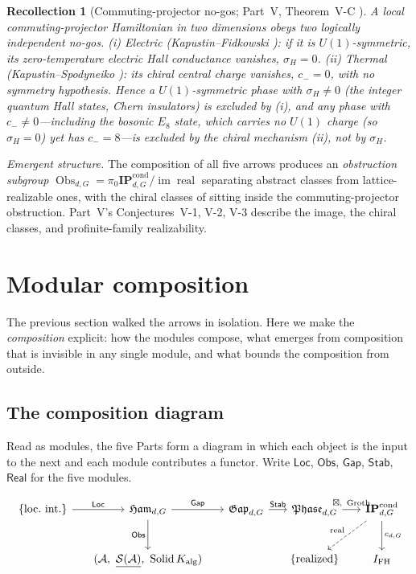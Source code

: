 \documentclass[12pt]{article}
\newcommand{\cond}[1]{\underline{#1}}          %
\newcommand{\Ham}{\mathfrak{Ham}}              %
\newcommand{\Gap}{\mathfrak{Gap}}              %
\newcommand{\Phase}{\mathfrak{Phase}}          %
\newcommand{\IPcond}{\mathbf{IP}^{\mathrm{cond}}}  %
\newcommand{\Kalg}{K_{\mathrm{alg}}}           %
\newcommand{\Solid}{\operatorname{Solid}}      %
\newcommand{\qA}{\mathcal{A}}                  %
\newcommand{\St}{\mathcal{S}}                  %
\newcommand{\Groth}{\operatorname{Groth}}      %
\newcommand{\IFH}{I_{\mathrm{FH}}}             %
\newcommand{\real}{\operatorname{real}}        %
\newcommand{\Obs}{\operatorname{Obs}}
\newcommand{\im}{\operatorname{im}}
\theoremstyle{plain}
\newtheorem{recollection}[recollection]{Recollection}
\theoremstyle{definition}
\theoremstyle{remark}
\begin{document}
\begin{recollection}[Commuting-projector no-gos; Part~V, Theorem~V-C \cite{kapustin-fidkowski,kapustin-spodyneiko-thermal,paperRealizability}]
\label{rec:VC}
A local commuting-projector Hamiltonian in two dimensions obeys two logically independent
no-gos. (i) \emph{Electric} (Kapustin--Fidkowski \cite{kapustin-fidkowski}): if it is
$U(1)$-symmetric, its zero-temperature electric Hall conductance vanishes, $\sigma_H=0$.
(ii) \emph{Thermal} (Kapustin--Spodyneiko \cite{kapustin-spodyneiko-thermal}): its chiral
central charge vanishes, $c_-=0$, with no symmetry hypothesis. Hence a $U(1)$-symmetric
phase with $\sigma_H\ne0$ (the integer quantum Hall states, Chern insulators) is excluded by
(i), and \emph{any} phase with $c_-\ne0$---including the bosonic $E_8$ state, which carries
no $U(1)$ charge (so $\sigma_H=0$) yet has $c_-=8$---is excluded by the chiral mechanism (ii),
not by $\sigma_H$.
\end{recollection}

\emph{Emergent structure.} The composition of all five arrows produces an
\emph{obstruction subgroup} $\Obs_{d,G}=\pi_0\IPcond_{d,G}/\im\real$ separating abstract
classes from lattice-realizable ones, with the chiral classes of  sitting
inside the commuting-projector obstruction. Part~V's Conjectures~V-1, V-2, V-3 describe
the image, the chiral classes, and profinite-family realizability.

\section{Modular composition}
\label{sec:composition}

The previous section walked the arrows in isolation. Here we make the \emph{composition}
explicit: how the modules compose, what emerges from composition that is invisible in any
single module, and what bounds the composition from outside.

\subsection{The composition diagram}
\label{sec:compdiagram}

Read as modules, the five Parts form a diagram in which each object is the input to the
next and each module contributes a functor. Write $\mathsf{Loc}$, $\mathsf{Obs}$,
$\mathsf{Gap}$, $\mathsf{Stab}$, $\mathsf{Real}$ for the five modules.

\begin{equation}
\label{eq:compdiagram}
\begin{tikzcd}[column sep=1.5em, row sep=2.6em]
\{\text{loc.\ int.}\}
  \arrow[r, "\mathsf{Loc}"]
& \Ham_{d,G}
  \arrow[r, "\mathsf{Gap}"]
  \arrow[d, "\mathsf{Obs}"']
& \Gap_{d,G}
  \arrow[r, "\mathsf{Stab}"]
& \Phase_{d,G}
  \arrow[r, "\boxtimes\text{, }\Groth"]
& \IPcond_{d,G}
  \arrow[d, "c_{d,G}"]
  \arrow[dl, dashed, "\real"'] \\
& (\qA,\ \cond{\St(\qA)},\ \Solid\Kalg)
&& \{\text{realized}\}
& \IFH
\end{tikzcd}
\end{equation}
\end{document}
